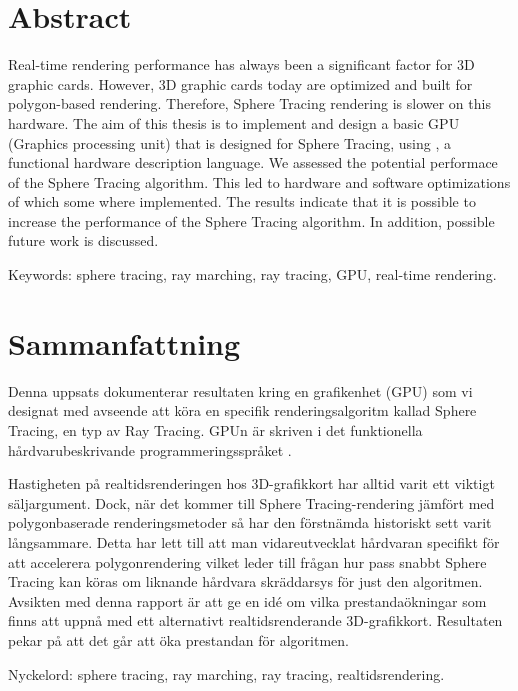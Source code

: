 \thispagestyle{plain}			%
\setlength{\parskip}{10pt}
\setlength{\parindent}{0pt}

\section*{Abstract}
	
	Real-time rendering performance has always been a significant factor for 3D
	graphic cards. However, 3D graphic cards today are optimized and built for
	polygon-based rendering. Therefore, Sphere Tracing rendering is slower on
	this hardware. The aim of this thesis is to implement and design a basic GPU
	(Graphics processing unit) that is designed for Sphere Tracing, using \clash,
	a functional hardware description language. We assessed the potential
	performace of the Sphere Tracing algorithm. This led to hardware and software
	optimizations of which some where implemented. The results indicate that it
	is possible to increase the performance of the Sphere Tracing algorithm. In
	addition, possible future work is discussed.

	\vfill
	Keywords: sphere tracing, ray marching, ray tracing, GPU, real-time rendering.

\newpage
\thispagestyle{plain}

\section*{Sammanfattning}
	
	Denna uppsats dokumenterar resultaten kring en grafikenhet (GPU) som vi
	designat med avseende att köra en specifik renderingsalgoritm kallad Sphere
	Tracing, en typ av Ray Tracing. GPUn är skriven i det funktionella
	hårdvarubeskrivande programmeringsspråket \clash.
	
	Hastigheten på realtidsrenderingen hos 3D-grafikkort har alltid varit ett
	viktigt säljargument. Dock, när det kommer till Sphere Tracing-rendering
	jämfört med polygonbaserade renderingsmetoder så har den förstnämda
	historiskt sett varit långsammare. Detta har lett till att man
	vidareutvecklat hårdvaran specifikt för att accelerera polygonrendering
	vilket leder till frågan hur pass snabbt Sphere Tracing kan köras om liknande
	hårdvara skräddarsys för just den algoritmen. Avsikten med denna rapport är
	att ge en idé om vilka prestandaökningar som finns att uppnå med ett
	alternativt realtidsrenderande 3D-grafikkort. Resultaten pekar på att det går
	att öka prestandan för algoritmen.

	\vfill
	Nyckelord: sphere tracing, ray marching, ray tracing, realtidsrendering.


\newpage
\thispagestyle{empty}
\mbox{}
